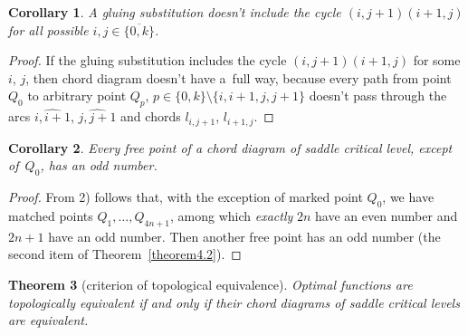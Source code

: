 \documentclass[10pt,a4paper]{amsart}
\numberwithin{equation}{section}
\newtheorem{Theorem}{Theorem}[section]
\newtheorem{Corollary}[Theorem]{Corollary}
\begin{document}
\begin{Corollary}\label{corollary4.1}
A gluing substitution doesn't include the cycle $(i,j+1)(i+1,j)$ for all possible $i,j\in\{\overline{0,k}\}$.
\end{Corollary}

\begin{proof}
If the gluing substitution includes the cycle $(i,j+1)(i+1,j)$ for some $i$, $j$, then chord diagram doesn't have a~full way, because every path from point $Q_0$ to arbitrary point $Q_p$, $p\in\{0,k\}{\setminus}\{i,i+1,j,j+1\}$ doesn't pass through the arcs $\widehat{i,i+1}$, $\widehat{j,j+1}$ and chords $l_{i,j+1}$, $l_{i+1,j}$.
\end{proof}

\begin{Corollary}\label{corollary4.2}
Every free point of a chord diagram of saddle critical level, except of~$Q_{0}$, has an odd number.
\end{Corollary}

\begin{proof}
From 2) follows that, with the exception of marked point $Q_{0}$, we have matched points $Q_{1},\ldots,Q_{4n+1}$, among which {\it exactly} $2n$ have an even number and $2n+1$ have an odd number. Then another free point has an odd number (the second item of Theorem~\ref{theorem4.2}).
\end{proof}


\begin{Theorem}[criterion of topological equivalence] \label{theorem4.3}
Optimal functions are topologically equi\-va\-lent if and only if their chord diagrams of saddle critical levels are equivalent.
\end{Theorem}
\end{document}
